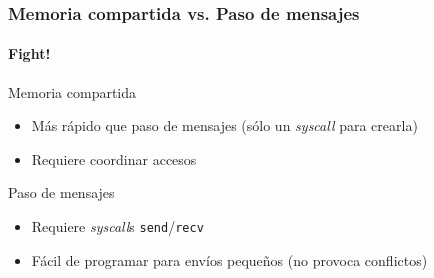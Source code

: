\documentclass[letter]{beamer}
\begin{document}
\begin{frame}
  \frametitle{Memoria compartida vs. Paso de mensajes}
  \framesubtitle{Fight!}
  
  \begin{block}{Memoria compartida}
    \begin{itemize}
      \item<4->Más rápido que paso de mensajes (sólo un {\em syscall} para crearla)
      \item<6->Requiere coordinar accesos
    \end{itemize}
  \end{block}

  \begin{block}{Paso de mensajes}
    \begin{itemize}
      \item<5->Requiere {\em syscall}s {\tt send}/{\tt recv}
      \item<7->Fácil de programar para envíos pequeños (no provoca conflictos)
    \end{itemize}
  \end{block}


\end{frame}
\end{document}
